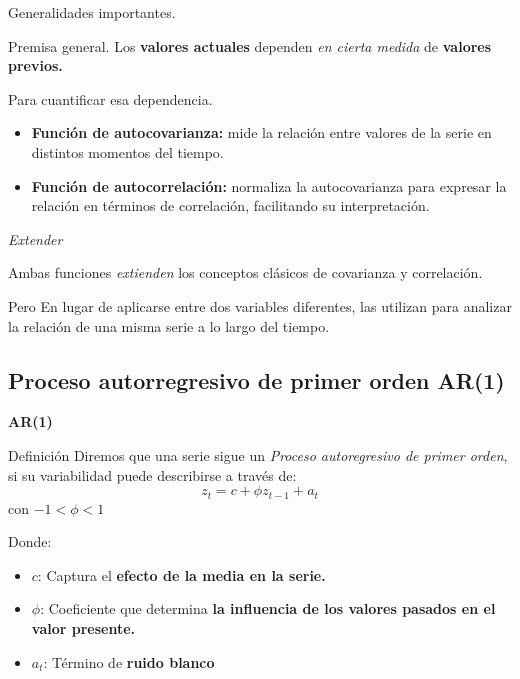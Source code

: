 \documentclass[11pt]{beamer}
\begin{document}
\begin{frame}{Generalidades importantes.}
\begin{block}{Premisa general.}
	Los \textbf{valores actuales} dependen \textit{en cierta medida} de \textbf{valores previos.}
\end{block}

\begin{block}{Para cuantificar esa dependencia.}
	\begin{itemize}
		\item \textbf{Función de autocovarianza:} mide la relación entre valores de la serie en distintos momentos del tiempo.
		\item \textbf{Función de autocorrelación:} normaliza la autocovarianza para expresar la relación en términos de correlación, facilitando su interpretación.  
	\end{itemize}
\end{block}
\end{frame}

\begin{frame}{\textit{Extender}}
\begin{block}{}
	Ambas funciones \textit{extienden} los conceptos clásicos de covarianza y correlación.
\end{block}

\begin{block}{Pero}
	En lugar de aplicarse entre dos variables diferentes, las utilizan para analizar la relación de una misma serie a lo largo del tiempo.
\end{block}

\end{frame}

\subsection{Proceso autorregresivo de primer orden AR(1)}
\begin{frame}{\textbf{AR(1)}}
\begin{block}{Definición}
Diremos que una serie sigue un \textit{Proceso autoregresivo de primer orden}, si su variabilidad puede describirse a través de: 
\begin{equation}
	z_t = c + \phi z_{t-1} + a_t
\end{equation}
con $-1 < \phi < 1$
\end{block}

\begin{block}{Donde:}
\begin{itemize}
	\item $c$: Captura el \textbf{efecto de la media en la serie.}
	\item $\phi$: Coeficiente que determina \textbf{la influencia de los valores pasados en el valor presente.}
	\item $a_t$: Término de \textbf{ruido blanco}
\end{itemize}
\end{block}


\end{frame}
\end{document}
